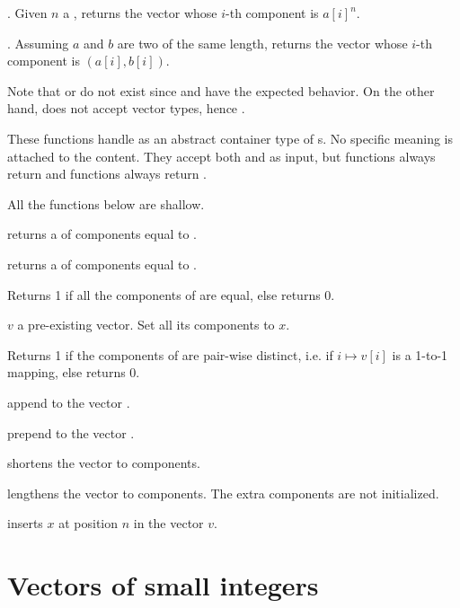 . Given $n$ a , returns
the vector whose $i$-th component is $a[i]^n$.

. Assuming $a$ and $b$ are two 
of the same length, returns the vector whose $i$-th component
is $(a[i], b[i])$.

Note that  or  do not exist since 
and  have the expected behavior. On the other hand,
 does not accept vector types, hence .


These functions handle  as an abstract container type of
s. No specific meaning is attached to the content. They accept both
 and  as input, but  functions always return
 and  functions always return .

 All the functions below are shallow.

 returns a  of  components
equal to .

 returns a  of  components
equal to .

 Returns 1 if all the components of  are
equal, else returns 0.

 $v$ a pre-existing vector. Set all its
components to $x$.

  Returns 1 if the components of  are
pair-wise distinct, i.e. if $i\mapsto v[i]$ is a 1-to-1 mapping, else returns
0.

 append  to the vector .

 prepend  to the vector .

 shortens the vector  to 
components.

 lengthens the vector 
to  components. The extra components are not initialized.

 inserts $x$ at position $n$ in the vector
$v$.

\section{Vectors of small integers}

